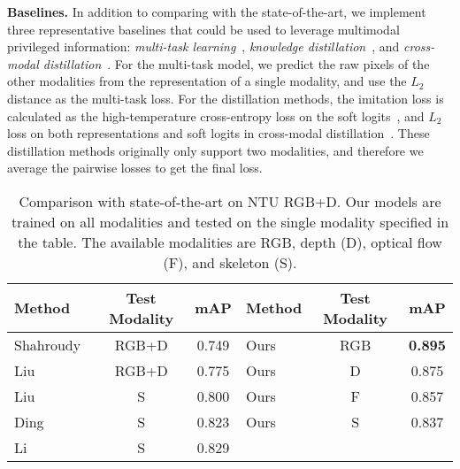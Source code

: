 \noindent\textbf{Baselines.}
In addition to comparing with the state-of-the-art, we implement three representative baselines that could be used to leverage multimodal privileged information: \textit{multi-task learning}~\cite{caruana1998multitask}, \textit{knowledge distillation}~\cite{distillation_hinton}, and \textit{cross-modal distillation}~\cite{distillation_gupta}. For the multi-task model, we predict the raw pixels of the other modalities from the representation of a single modality, and use the $L_2$ distance as the multi-task loss. For the distillation methods, the imitation loss is calculated as the high-temperature cross-entropy loss on the soft logits~\cite{distillation_hinton}, and $L_2$ loss on both representations and soft logits in cross-modal distillation~\cite{distillation_gupta}. These distillation methods originally only support two modalities, and therefore we average the pairwise losses to get the final loss.



\begin{table}[t]
\centering
\scriptsize
\caption{Comparison with state-of-the-art on NTU RGB+D. Our models are trained on all modalities and tested on the single modality specified in the table. The available modalities are RGB, depth (D), optical flow (F), and skeleton (S).}
\label{ntu_state_of_the_art}
\begin{tabular}{lc@{\hskip 0.1in}c@{\hskip 0.8in}l@{\hskip 0.4in}c@{\hskip 0.1in}c}
\toprule
Method & Test Modality & mAP & Method & Test Modality & mAP  \\
\midrule
Shahroudy~\cite{shahroudy2017deep} & RGB+D & 0.749 & Ours & RGB & \textbf{0.895} \\
Liu~\cite{liu2017viewpoint} & RGB+D & 0.775 & Ours  & D & 0.875 \\
Liu~\cite{skeleton_visualization} & S & 0.800 & Ours  & F & 0.857 \\
Ding~\cite{ding2017investigation} & S & 0.823 & Ours  & S & 0.837 \\
Li~\cite{10-stream} & S & 0.829 &&& \\
\bottomrule
\end{tabular}
\end{table}

